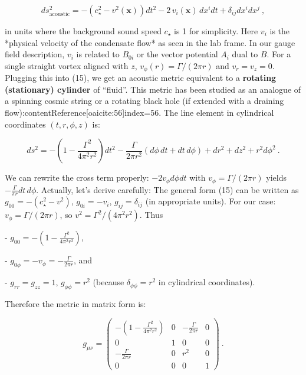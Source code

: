 \documentclass[12pt]{article}
\begin{document}
\[ ds^2_{\text{acoustic}} = -\left(c_\star^2 - v^2(\mathbf{x})\right)dt^2 - 2\, v_i(\mathbf{x})\, dx^i dt + \delta_{ij} dx^i dx^j~, \tag{15} \] 

in units where the background sound speed $c_\star$ is 1 for simplicity. Here $v_i$ is the *physical velocity of the condensate flow* as seen in the lab frame. In our gauge field description, $v_i$ is related to $B_{0i}$ or the vector potential $A_i$ dual to $B$. For a single straight vortex aligned with $z$, $v_\phi(r) = \Gamma/(2\pi r)$ and $v_r = v_z = 0$. Plugging this into (15), we get an acoustic metric equivalent to a \textbf{rotating (stationary) cylinder} of “fluid”. This metric has been studied as an analogue of a spinning cosmic string or a rotating black hole (if extended with a draining flow):contentReference[oaicite:56]{index=56}. The line element in cylindrical coordinates $(t,r,\phi,z)$ is:

\[ ds^2 = -\left(1 - \frac{\Gamma^2}{4\pi^2 r^2}\right)dt^2 - \frac{\Gamma}{2\pi r^2}(d\phi\, dt + dt\, d\phi) + dr^2 + dz^2 + r^2 d\phi^2~. \tag{16}\]

We can rewrite the cross term properly: $-2v_\phi d\phi dt$ with $v_\phi = \Gamma/(2\pi r)$ yields $-\frac{\Gamma}{\pi r} dt\, d\phi$. Actually, let’s derive carefully: The general form (15) can be written as $g_{00} = -(c_\star^2 - v^2)$, $g_{0i} = -v_i$, $g_{ij} = \delta_{ij}$ (in appropriate units). For our case: $v_\phi = \Gamma/(2\pi r)$, so $v^2 = \Gamma^2/(4\pi^2 r^2)$. Thus 

- $g_{00} = -\left(1 - \frac{\Gamma^2}{4\pi^2 r^2}\right)$, 

- $g_{0\phi} = - v_\phi = -\frac{\Gamma}{2\pi r}$, and 

- $g_{rr}=g_{zz}=1$, $g_{\phi\phi} = r^2$ (because $\delta_{\phi\phi} = r^2$ in cylindrical coordinates).

Therefore the metric in matrix form is:

\[ g_{\mu\nu} = \begin{pmatrix} -(1 - \frac{\Gamma^2}{4\pi^2 r^2}) & 0 & -\frac{\Gamma}{2\pi r} & 0 \\ 0 & 1 & 0 & 0 \\ -\frac{\Gamma}{2\pi r} & 0 & r^2 & 0 \\ 0 & 0 & 0 & 1 \end{pmatrix}~. \tag{17}\]
\end{document}
